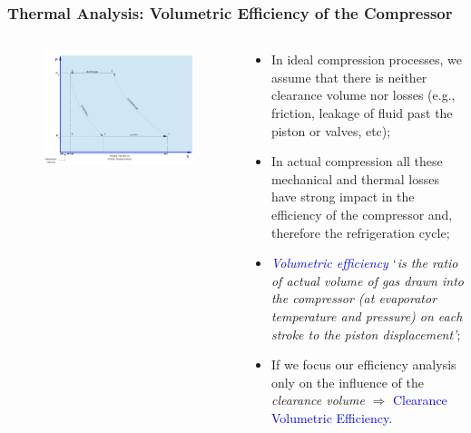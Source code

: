 \documentclass[10pt,compress]{beamer}
\begin{document}
\begin{frame}
 \frametitle{Thermal Analysis: Volumetric Efficiency of the Compressor}
 \begin{columns}
  \begin{column}[c]{0.45\linewidth}
   \begin{figure}%
      \includegraphics[width=5.cm,height=5.cm,clip]{./Pics/Overview_Refrig29}
   \end{figure}  
  \end{column}  
  \begin{column}[c]{0.55\linewidth}
   \begin{itemize}
    \item <1-> In ideal compression processes, we assume that there is neither clearance volume nor losses (e.g., friction, leakage of fluid past the piston or valves, etc);
    \item <2-> In actual compression all these mechanical and thermal losses have strong impact in the efficiency of the compressor and, therefore the refrigeration cycle;
    \item <3-> \textcolor{blue}{{\it Volumetric efficiency}} $\lq${\it is the ratio of actual volume of gas drawn into the compressor (at evaporator temperature and pressure) on each stroke to the piston displacement'};
    \item <4-> If we focus our efficiency analysis only on the influence of the {\it clearance volume} $\Rightarrow$ \textcolor{blue}{Clearance Volumetric Efficiency}.
   \end{itemize} 
  \end{column}  
 \end{columns}
\end{frame}
\end{document}
